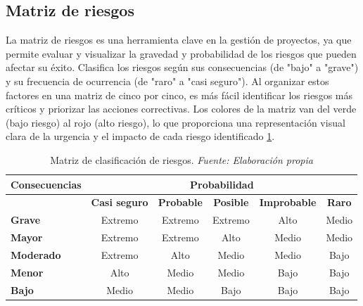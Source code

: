 \subsection{Matriz de riesgos}
La matriz de riesgos es una herramienta clave en la gestión de proyectos, ya que permite evaluar y visualizar la gravedad y probabilidad de los riesgos que pueden afectar su éxito. Clasifica los riesgos según sus consecuencias (de "bajo" a "grave") y su frecuencia de ocurrencia (de "raro" a "casi seguro"). Al organizar estos factores en una matriz de cinco por cinco, es más fácil identificar los riesgos más críticos y priorizar las acciones correctivas. Los colores de la matriz van del verde (bajo riesgo) al rojo (alto riesgo), lo que proporciona una representación visual clara de la urgencia y el impacto de cada riesgo identificado \ref{tabla:matriz_riesgos}.

\begin{table}[H]
	\centering
	\begin{tabular}{|>{\centering\arraybackslash}m{2.5cm}|c|c|c|c|c|}
		\hline
		\rowcolor{black!75} \color{white} {\textbf{Consecuencias}} & \multicolumn{5}{c|}{ \color{white} \textbf{Probabilidad}} \\ \cline{2-6}
		\cellcolor{white} & \textbf{Casi seguro} & \textbf{Probable} & \textbf{Posible} & \textbf{Improbable} & \textbf{Raro} \\ \hline
		\textbf{Grave} & \cellcolor{red!80}Extremo & \cellcolor{red!80}Extremo & \cellcolor{red!80}Extremo & \cellcolor{orange!80}Alto & \cellcolor{yellow!60}Medio \\ \hline
		\textbf{Mayor} & \cellcolor{red!80}Extremo & \cellcolor{red!80}Extremo & \cellcolor{orange!80}Alto & \cellcolor{yellow!60}Medio & \cellcolor{yellow!60}Medio \\ \hline
		\textbf{Moderado} & \cellcolor{red!80}Extremo & \cellcolor{orange!80}Alto & \cellcolor{yellow!60}Medio & \cellcolor{yellow!60}Medio & \cellcolor{green!60}Bajo \\ \hline
		\textbf{Menor} & \cellcolor{orange!80}Alto & \cellcolor{yellow!60}Medio & \cellcolor{yellow!60}Medio & \cellcolor{green!60}Bajo & \cellcolor{green!60}Bajo \\ \hline
		\textbf{Bajo} & \cellcolor{yellow!60}Medio & \cellcolor{yellow!60}Medio & \cellcolor{green!60}Bajo & \cellcolor{green!60}Bajo & \cellcolor{green!60}Bajo \\ \hline
	\end{tabular}
	\caption[Matriz de clasificación de riesgos.]{Matriz de clasificación de riesgos. \textit{Fuente: Elaboración propia}}
	\label{tabla:matriz_riesgos}
\end{table}


